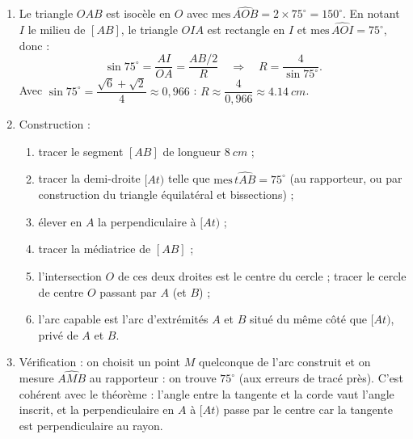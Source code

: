 \documentclass[11pt]{article}
\begin{document}
\begin{corrige}
\begin{enumerate}
\item Le triangle $OAB$ est isocèle en $O$ avec $\mathrm{mes}\,\widehat{AOB} = 2 \times 75^{\circ} = 150^{\circ}$. En notant $I$ le milieu de $[AB]$, le triangle $OIA$ est rectangle en $I$ et $\mathrm{mes}\,\widehat{AOI} = 75^{\circ}$, donc :
\[ \sin 75^{\circ} = \frac{AI}{OA} = \frac{AB/2}{R} \quad\Longrightarrow\quad R = \frac{4}{\sin 75^{\circ}}. \]
Avec $\sin 75^{\circ} = \dfrac{\sqrt{6}+\sqrt{2}}{4} \approx 0{,}966$ : $R \approx \dfrac{4}{0{,}966} \approx \SI{4,14}{cm}$.
\item Construction :
\begin{enumerate}
\item tracer le segment $[AB]$ de longueur $\SI{8}{cm}$ ;
\item tracer la demi-droite $[At)$ telle que $\mathrm{mes}\,\widehat{tAB} = 75^{\circ}$ (au rapporteur, ou par construction du triangle équilatéral et bissections) ;
\item élever en $A$ la perpendiculaire à $[At)$ ;
\item tracer la médiatrice de $[AB]$ ;
\item l'intersection $O$ de ces deux droites est le centre du cercle ; tracer le cercle de centre $O$ passant par $A$ (et $B$) ;
\item l'arc capable est l'arc d'extrémités $A$ et $B$ situé du même côté que $[At)$, privé de $A$ et $B$.
\end{enumerate}
\item Vérification : on choisit un point $M$ quelconque de l'arc construit et on mesure $\widehat{AMB}$ au rapporteur : on trouve $75^{\circ}$ (aux erreurs de tracé près). C'est cohérent avec le théorème : l'angle entre la tangente et la corde vaut l'angle inscrit, et la perpendiculaire en $A$ à $[At)$ passe par le centre car la tangente est perpendiculaire au rayon.
\end{enumerate}
\end{corrige}
\end{document}

